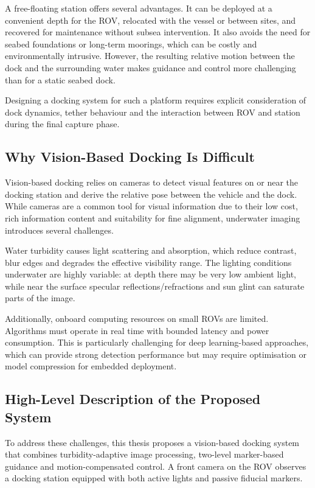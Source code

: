 A free-floating station offers several advantages. It can be deployed at a convenient depth for the ROV, relocated with the vessel or between sites, and recovered for maintenance without subsea intervention. It also avoids the need for seabed foundations or long-term moorings, which can be costly and environmentally intrusive. However, the resulting relative motion between the dock and the surrounding water makes guidance and control more challenging than for a static seabed dock.

Designing a docking system for such a platform requires explicit consideration of dock dynamics, tether behaviour and the interaction between ROV and station during the final capture phase.

\subsection{Why Vision-Based Docking Is Difficult}

Vision-based docking relies on cameras to detect visual features on or near the docking station and derive the relative pose between the vehicle and the dock. While cameras are a common tool for visual information due to their low cost, rich information content and suitability for fine alignment, underwater imaging introduces several challenges.

Water turbidity causes light scattering and absorption, which reduce contrast, blur edges and degrades the effective visibility range. The lighting conditions underwater are highly variable: at depth there may be very low ambient light, while near the surface specular reflections/refractions and sun glint can saturate parts of the image.

Additionally, onboard computing resources on small ROVs are limited. Algorithms must operate in real time with bounded latency and power consumption. This is particularly challenging for deep learning-based approaches, which can provide strong detection performance but may require optimisation or model compression for embedded deployment.

\subsection{High-Level Description of the Proposed System}

To address these challenges, this thesis proposes a vision-based docking system that combines turbidity-adaptive image processing, two-level marker-based guidance and motion-compensated control. A front camera on the ROV observes a docking station equipped with both active lights and passive fiducial markers.

